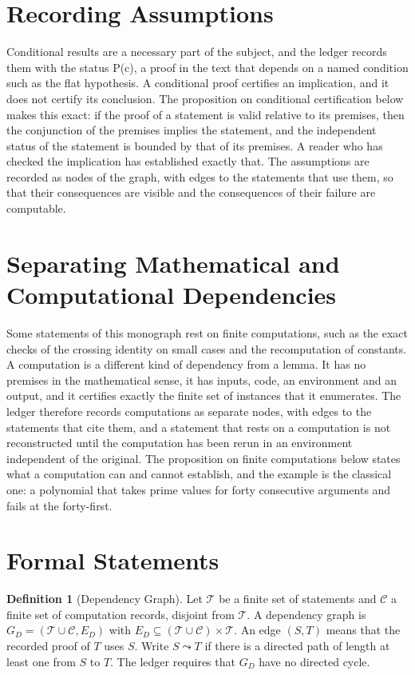 \documentclass[11pt,letterpaper]{report}
\theoremstyle{plain}
\theoremstyle{definition}
\newtheorem{definition}[theorem]{Definition}
\theoremstyle{remark}
\begin{document}
\section{Recording Assumptions}

Conditional results are a necessary part of the subject, and the ledger records them with the status P(c), a proof in the text that depends on a named condition such as the flat hypothesis. A conditional proof certifies an implication, and it does not certify its conclusion. The proposition on conditional certification below makes this exact: if the proof of a statement is valid relative to its premises, then the conjunction of the premises implies the statement, and the independent status of the statement is bounded by that of its premises. A reader who has checked the implication has established exactly that. The assumptions are recorded as nodes of the graph, with edges to the statements that use them, so that their consequences are visible and the consequences of their failure are computable.

\section{Separating Mathematical and Computational Dependencies}

Some statements of this monograph rest on finite computations, such as the exact checks of the crossing identity on small cases and the recomputation of constants. A computation is a different kind of dependency from a lemma. It has no premises in the mathematical sense, it has inputs, code, an environment and an output, and it certifies exactly the finite set of instances that it enumerates. The ledger therefore records computations as separate nodes, with edges to the statements that cite them, and a statement that rests on a computation is not reconstructed until the computation has been rerun in an environment independent of the original. The proposition on finite computations below states what a computation can and cannot establish, and the example is the classical one: a polynomial that takes prime values for forty consecutive arguments and fails at the forty-first.

\section{Formal Statements}

\begin{definition}[Dependency Graph]\label{def:depgraph}
Let $\mathcal T$ be a finite set of statements and $\mathcal C$ a finite set of computation records, disjoint from $\mathcal T$. A dependency graph is $G_D=(\mathcal T\cup\mathcal C,E_D)$ with $E_D\subseteq(\mathcal T\cup\mathcal C)\times\mathcal T$. An edge $(S,T)$ means that the recorded proof of $T$ uses $S$. Write $S\leadsto T$ if there is a directed path of length at least one from $S$ to $T$. The ledger requires that $G_D$ have no directed cycle.
\end{definition}
\end{document}
